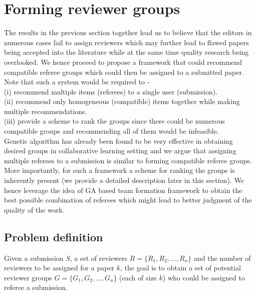 \noindent
\section{Forming reviewer groups}
\label{group}

The results in the previous section together lead us to believe that the editors in numerous cases fail to assign reviewers which may further lead to flawed papers 
being accepted into the literature while at 
the same time quality research being overlooked. We hence proceed to propose a framework that could recommend compatible referee groups which could then be assigned to 
a submitted paper. 
Note that such a system would be required to - \\
(i) recommend multiple items (referees) to a single user (submission).\\ 
(ii) recommend only homogeneous (compatible) items together while making multiple recommendations. \\ 
(iii) provide a scheme to rank the groups since there could be numerous compatible groups and recommending all of them would be infeasible. \\
Genetic algorithm has already been found to be very effective in obtaining desired groups in collaborative learning setting \cite{moreno2012genetic,ani2010method} 
and we argue that assigning multiple referees to a submission is similar to forming 
compatible referee groups. More importantly, for such a framework a scheme for ranking the groups is inherently present (we provide a detailed description later in this section).   
We hence leverage the idea of GA based team formation framework to obtain the best possible combination of referees which might lead to better judgment of the quality 
of the work. 


\subsection{Problem definition} Given a submission $S$, a set of reviewers $R = \{R_1, R_2,\ldots, R_n\}$ and the number 
of reviewers to be assigned for a paper $k$, the goal is to obtain a set of potential reviewer groups $G = \{ G_1, G_2, \ldots, G_u\}$ (each of size $k$) 
who could be assigned to referee a submission.

